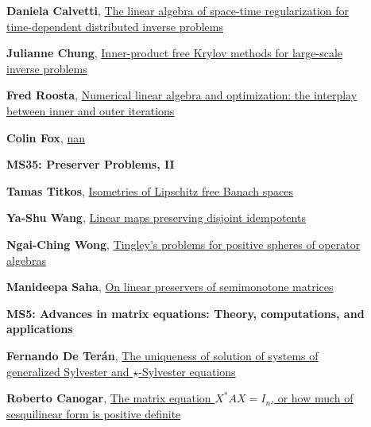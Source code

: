 \documentclass[ILAS2025-program.tex]{subfiles}
\begin{document}
\begin{description}
\begin{description}
    \item[] \hypertarget{up0311}{}\textbf{Daniela Calvetti}, \hyperlink{down0311}{The linear algebra of space-time regularization for time-dependent distributed inverse problems}
        \item[] \hypertarget{up0312}{}\textbf{Julianne Chung}, \hyperlink{down0312}{Inner-product free Krylov methods for large-scale inverse problems}
        \item[] \hypertarget{up0313}{}\textbf{Fred Roosta}, \hyperlink{down0313}{Numerical linear algebra and optimization: the interplay between inner and outer iterations
}
        \item[] \hypertarget{up0314}{}\textbf{Colin Fox}, \hyperlink{down0314}{nan}
        \end{description}
    \begin{description}
    \item[] {\color{mstitle}\textbf{MS35: Preserver Problems, II}} 
    \item[] \hypertarget{up0315}{}\textbf{Tamas Titkos}, \hyperlink{down0315}{Isometries of Lipschitz free Banach spaces}
        \item[] \hypertarget{up0316}{}\textbf{Ya-Shu Wang}, \hyperlink{down0316}{Linear maps preserving disjoint idempotents
}
        \item[] \hypertarget{up0317}{}\textbf{Ngai-Ching Wong}, \hyperlink{down0317}{Tingley's problems for positive spheres of operator algebras}
        \item[] \hypertarget{up0318}{}\textbf{Manideepa Saha}, \hyperlink{down0318}{On linear preservers of semimonotone matrices}
        \end{description}
    \begin{description}
    \item[] {\color{mstitle}\textbf{MS5: Advances in matrix equations: Theory, computations, and applications}} 
    \item[] \hypertarget{up0319}{}\textbf{Fernando De Terán}, \hyperlink{down0319}{The uniqueness of solution of systems of generalized Sylvester and $\star$-Sylvester equations}
        \item[] \hypertarget{up0320}{}\textbf{Roberto Canogar}, \hyperlink{down0320}{The matrix equation $X^*AX=I_n$, or how much of sesquilinear form is positive definite
}
\end{description}
\end{description}
\end{document}
